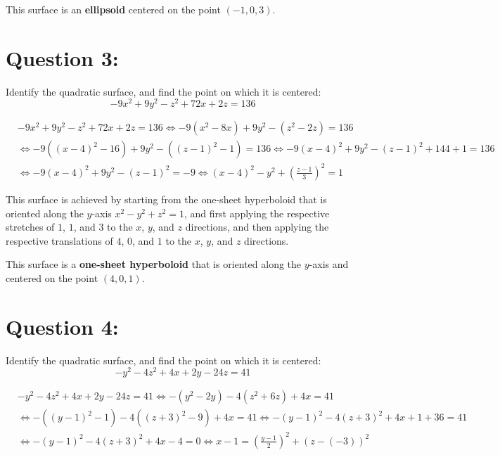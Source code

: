 \documentclass{article}
\newcommand{\dr}[1]{\textcolor{dark_red}{#1}}
\begin{document}
\dr{This surface is an \textbf{ellipsoid} centered on the point \((-1, 0, 3)\).} 

\pagebreak



\section*{Question 3:}

Identify the quadratic surface, and find the point on which it is centered:
\[-9x^2 + 9y^2 - z^2 + 72x + 2z = 136\]

\dr{\begin{align*}
& -9x^2 + 9y^2 - z^2 + 72x + 2z = 136
 \iff -9(x^2 - 8x) + 9y^2 - (z^2 - 2z) = 136 \\
& \iff -9((x-4)^2 - 16) + 9y^2 - ((z-1)^2 - 1) = 136 
 \iff -9(x-4)^2 + 9y^2 - (z-1)^2 + 144 + 1 = 136 \\
& \iff -9(x-4)^2 + 9y^2 - (z-1)^2 = -9 
 \iff (x-4)^2 - y^2 + \left(\frac{z-1}{3}\right)^2 = 1 
\end{align*}}

\dr{This surface is achieved by starting from the one-sheet hyperboloid that is oriented along the \(y\)-axis \(x^2 - y^2 + z^2 = 1\), and first applying the respective stretches of \(1\), \(1\), and \(3\) to the \(x\), \(y\), and \(z\) directions, and then applying the respective translations of \(4\), \(0\), and \(1\) to the \(x\), \(y\), and \(z\) directions.}

\dr{This surface is a \textbf{one-sheet hyperboloid} that is oriented along the \(y\)-axis and centered on the point \((4, 0, 1)\).}



\section*{Question 4:}

Identify the quadratic surface, and find the point on which it is centered:
\[-y^2 - 4z^2 + 4x + 2y - 24z = 41\]

\dr{\begin{align*}
& -y^2 - 4z^2 + 4x + 2y - 24z = 41
 \iff -(y^2 - 2y) - 4(z^2 + 6z) + 4x = 41 \\
& \iff -((y-1)^2 - 1) - 4((z+3)^2 - 9) + 4x = 41 
 \iff -(y-1)^2 - 4(z+3)^2 + 4x + 1 + 36 = 41 \\
& \iff -(y-1)^2 - 4(z+3)^2 + 4x - 4 = 0 
 \iff x - 1 = \left(\frac{y-1}{2}\right)^2 + (z - (-3))^2
\end{align*}}
\end{document}
